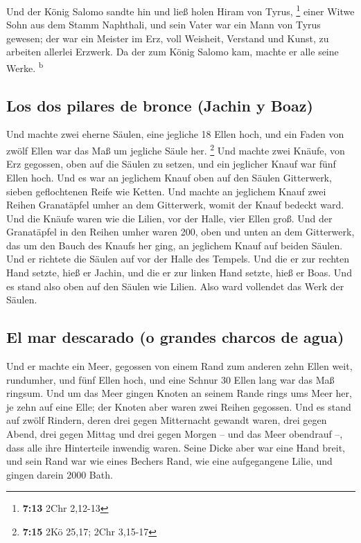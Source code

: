  Und der König Salomo sandte hin und ließ holen Hiram von
Tyrus, \footnote{\textbf{7:13} 2Chr 2,12-13}  einer Witwe
Sohn aus dem Stamm Naphthali, und sein Vater war ein Mann von Tyrus
gewesen; der war ein Meister im Erz, voll Weisheit, Verstand und Kunst,
zu arbeiten allerlei Erzwerk. Da der zum König Salomo kam, machte er
alle seine Werke. \textsuperscript{b}

\hypertarget{los-dos-pilares-de-bronce-jachin-y-boaz}{%
\subsection{Los dos pilares de bronce (Jachin y
Boaz)}\label{los-dos-pilares-de-bronce-jachin-y-boaz}}

 Und machte zwei eherne Säulen, eine jegliche 18 Ellen
hoch, und ein Faden von zwölf Ellen war das Maß um jegliche Säule her.
\footnote{\textbf{7:15} 2Kö 25,17; 2Chr 3,15-17}  Und
machte zwei Knäufe, von Erz gegossen, oben auf die Säulen zu setzen, und
ein jeglicher Knauf war fünf Ellen hoch.  Und es war an
jeglichem Knauf oben auf den Säulen Gitterwerk, sieben geflochtenen
Reife wie Ketten.  Und machte an jeglichem Knauf zwei
Reihen Granatäpfel umher an dem Gitterwerk, womit der Knauf bedeckt
ward.  Und die Knäufe waren wie die Lilien, vor der
Halle, vier Ellen groß.  Und der Granatäpfel in den
Reihen umher waren 200, oben und unten an dem Gitterwerk, das um den
Bauch des Knaufs her ging, an jeglichem Knauf auf beiden Säulen.
 Und er richtete die Säulen auf vor der Halle des
Tempels. Und die er zur rechten Hand setzte, hieß er Jachin, und die er
zur linken Hand setzte, hieß er Boas.  Und es stand also
oben auf den Säulen wie Lilien. Also ward vollendet das Werk der Säulen.

\hypertarget{el-mar-descarado-o-grandes-charcos-de-agua}{%
\subsection{El mar descarado (o grandes charcos de
agua)}\label{el-mar-descarado-o-grandes-charcos-de-agua}}

 Und er machte ein Meer, gegossen von einem Rand zum
anderen zehn Ellen weit, rundumher, und fünf Ellen hoch, und eine Schnur
30 Ellen lang war das Maß ringsum.  Und um das Meer
gingen Knoten an seinem Rande rings ums Meer her, je zehn auf eine Elle;
der Knoten aber waren zwei Reihen gegossen.  Und es stand
auf zwölf Rindern, deren drei gegen Mitternacht gewandt waren, drei
gegen Abend, drei gegen Mittag und drei gegen Morgen -- und das Meer
obendrauf --, dass alle ihre Hinterteile inwendig waren. 
Seine Dicke aber war eine Hand breit, und sein Rand war wie eines
Bechers Rand, wie eine aufgegangene Lilie, und gingen darein 2000 Bath.

